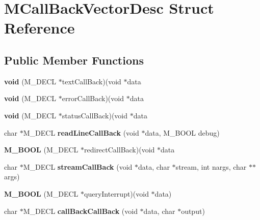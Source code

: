 \hypertarget{struct_m_call_back_vector_desc}{
\section{MCallBackVectorDesc Struct Reference}
\label{struct_m_call_back_vector_desc}
}
\subsection*{Public Member Functions}
\begin{DoxyCompactItemize}
\item 
\hypertarget{struct_m_call_back_vector_desc_a3b5ea7c513dd154e9fcf2a8d7e1a12db}{
{\bfseries void} (M\_\-DECL $\ast$textCallBack)(void $\ast$data}
\label{struct_m_call_back_vector_desc_a3b5ea7c513dd154e9fcf2a8d7e1a12db}

\item 
\hypertarget{struct_m_call_back_vector_desc_a6b122c8ffac7aa9b6431326f0fde6d50}{
{\bfseries void} (M\_\-DECL $\ast$errorCallBack)(void $\ast$data}
\label{struct_m_call_back_vector_desc_a6b122c8ffac7aa9b6431326f0fde6d50}

\item 
\hypertarget{struct_m_call_back_vector_desc_a3fffea7046f55f8e60ebec49ac3afe1d}{
{\bfseries void} (M\_\-DECL $\ast$statusCallBack)(void $\ast$data}
\label{struct_m_call_back_vector_desc_a3fffea7046f55f8e60ebec49ac3afe1d}

\item 
\hypertarget{struct_m_call_back_vector_desc_a937d0462d619dae9d0eb298cc08231e2}{
char $\ast$M\_\-DECL {\bfseries readLineCallBack} (void $\ast$data, M\_\-BOOL debug)}
\label{struct_m_call_back_vector_desc_a937d0462d619dae9d0eb298cc08231e2}

\item 
\hypertarget{struct_m_call_back_vector_desc_a0611888e739870fe72ed3adc4290af86}{
{\bfseries M\_\-BOOL} (M\_\-DECL $\ast$redirectCallBack)(void $\ast$data}
\label{struct_m_call_back_vector_desc_a0611888e739870fe72ed3adc4290af86}

\item 
\hypertarget{struct_m_call_back_vector_desc_ab46d04341353c130d9f0f55419fae01a}{
char $\ast$M\_\-DECL {\bfseries streamCallBack} (void $\ast$data, char $\ast$stream, int nargs, char $\ast$$\ast$args)}
\label{struct_m_call_back_vector_desc_ab46d04341353c130d9f0f55419fae01a}

\item 
\hypertarget{struct_m_call_back_vector_desc_a4e0cc746329ca8589d30580dda34e33d}{
{\bfseries M\_\-BOOL} (M\_\-DECL $\ast$queryInterrupt)(void $\ast$data)}
\label{struct_m_call_back_vector_desc_a4e0cc746329ca8589d30580dda34e33d}

\item 
\hypertarget{struct_m_call_back_vector_desc_aac4c4af5b679d34fdf9cb95ad8de8d95}{
char $\ast$M\_\-DECL {\bfseries callBackCallBack} (void $\ast$data, char $\ast$output)}
\label{struct_m_call_back_vector_desc_aac4c4af5b679d34fdf9cb95ad8de8d95}

\end{DoxyCompactItemize}
